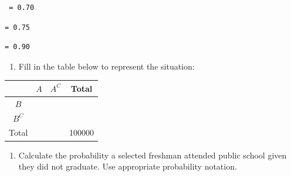 \documentclass[
]{report}
\providecommand{\tightlist}{%
  \setlength{\itemsep}{0pt}\setlength{\parskip}{0pt}}
\begin{document}
\vspace{2mm}

\begin{verbatim}
 = 0.70
\end{verbatim}

\vspace{2mm}

\begin{verbatim}
= 0.75
\end{verbatim}

\vspace{2mm}

\begin{verbatim}
= 0.90
\end{verbatim}

\vspace{2mm}

\begin{enumerate}
\def\labelenumi{\alph{enumi}.}
\setcounter{enumi}{1}
\tightlist
\item
  Fill in the table below to represent the situation:
\end{enumerate}

\begin{center}
\begin{tabular}{|c|c|c|c|} \hline
\hspace{0.8in} & \hspace{0.25in}  $A$ \hspace{.25in} & \hspace{0.25in} $A^C$ \hspace{0.25in} & \hspace{0.25in} Total \hspace{0.25in} \\ \hline
 $B$ &  &  &  \\ \hline
 $B^C$ &  & &  \\ \hline
Total &  &  & 100000 \\ \hline
\end{tabular}
\end{center}
\vspace{.1in}

\begin{enumerate}
\def\labelenumi{\alph{enumi}.}
\setcounter{enumi}{2}
\tightlist
\item
  Calculate the probability a selected freshman attended public school given they did not graduate. Use appropriate probability notation.
\end{enumerate}

\vspace{1in}
\end{document}
